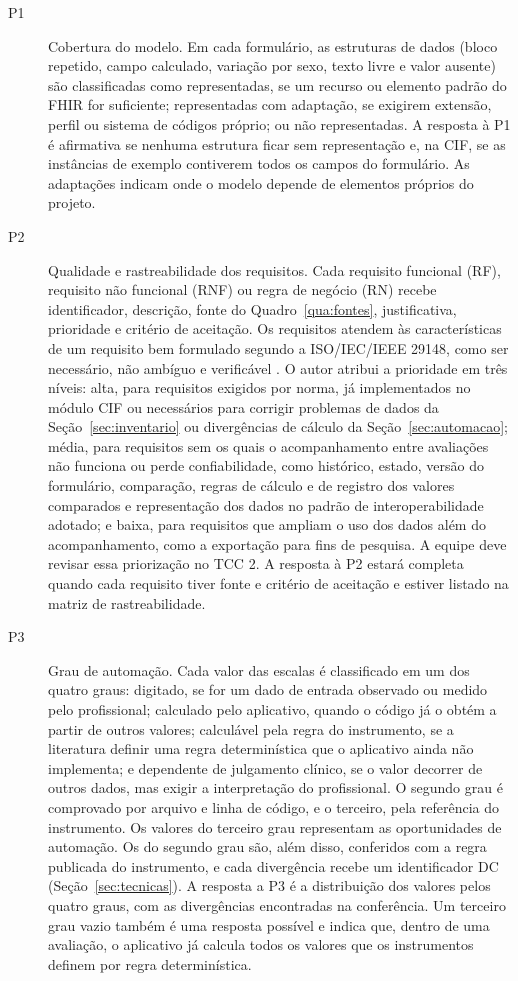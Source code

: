 \begin{description}
	\item [P1] Cobertura do modelo. Em cada formulário, as estruturas de dados (bloco repetido, campo calculado,
	variação por sexo, texto livre e valor ausente) são classificadas como representadas, se um recurso ou elemento
	padrão do FHIR for suficiente; representadas com adaptação, se exigirem extensão, perfil ou sistema de códigos
	próprio; ou não representadas. A resposta à P1 é afirmativa se nenhuma estrutura ficar sem representação e, na
	CIF, se as instâncias de exemplo contiverem todos os campos do formulário. As adaptações indicam onde o modelo
	depende de elementos próprios do projeto.
	\item [P2] Qualidade e rastreabilidade dos requisitos. Cada requisito funcional (RF), requisito não funcional
	(RNF) ou regra de negócio (RN) recebe identificador, descrição, fonte do Quadro~\ref{qua:fontes}, justificativa,
	prioridade e critério de aceitação. Os requisitos atendem às características de um requisito bem formulado
	segundo a ISO/IEC/IEEE 29148, como ser necessário, não ambíguo e verificável \cite{iso29148:2018}. O autor atribui
	a prioridade em três níveis: alta, para requisitos exigidos por norma, já implementados no módulo CIF ou
	necessários para corrigir problemas de dados da Seção~\ref{sec:inventario} ou divergências de cálculo da
	Seção~\ref{sec:automacao}; média, para requisitos sem os quais o acompanhamento entre avaliações não funciona ou
	perde confiabilidade, como histórico, estado, versão do formulário, comparação, regras de cálculo e de registro
	dos valores comparados e representação dos dados no padrão de interoperabilidade adotado; e baixa, para
	requisitos que ampliam o uso dos dados além do acompanhamento, como a exportação para fins de pesquisa. A equipe
	deve revisar essa priorização no TCC 2. A resposta à P2 estará completa quando cada requisito tiver fonte e
	critério de aceitação e estiver listado na matriz de rastreabilidade.
	\item [P3] Grau de automação. Cada valor das escalas é classificado em um dos quatro graus: digitado, se for um
	dado de entrada observado ou medido pelo profissional; calculado pelo aplicativo, quando o código já o obtém a
	partir de outros valores; calculável pela regra do instrumento, se a literatura definir uma regra determinística
	que o aplicativo ainda não implementa; e dependente de julgamento clínico, se o valor decorrer de outros dados,
	mas exigir a interpretação do profissional. O segundo grau é comprovado por arquivo e linha de código, e o
	terceiro, pela referência do instrumento. Os valores do terceiro grau representam as oportunidades de automação.
	Os do segundo grau são, além disso, conferidos com a regra publicada do instrumento, e cada divergência
	recebe um identificador DC (Seção~\ref{sec:tecnicas}). A resposta a P3 é a distribuição dos valores pelos
	quatro graus, com as divergências encontradas na conferência. Um terceiro grau vazio também é uma resposta
	possível e indica que, dentro de uma avaliação, o aplicativo já calcula todos os valores que os instrumentos
	definem por regra determinística.
\end{description}

